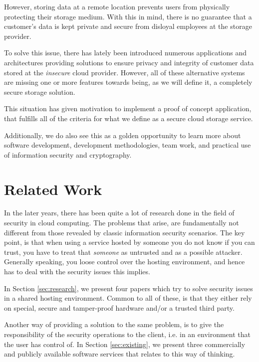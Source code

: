 \documentclass[pdftex,english,10pt,b5paper,twoside]{book}
\begin{document}
However, storing data at a remote location prevents users from physically
protecting their storage medium. With this in mind, there is no guarantee that
a customer's data is kept private and secure from disloyal employees at the
storage provider.

To solve this issue, there has lately been introduced numerous applications and
architectures \cite{dropbox_security, tahoe, tccp, PasS} providing solutions to
ensure privacy and integrity of customer data stored at the \emph{insecure}
cloud provider. However, all of these alternative systems are missing one
or more features towards being, as we will define it, a completely secure
storage solution.

This situation has given motivation to implement a proof of concept
application, that fulfills all of the criteria for what we define as a secure
cloud storage service.

Additionally, we do also see this as a golden opportunity to learn more
about software development, development methodologies, team work, and practical
use of information security and cryptography.

\section{Related Work}

In the later years, there has been quite a lot of research done in the field of
security in cloud computing. The problems that arise, are fundamentally not
different from those revealed by classic information security scenarios. The
key point, is that when using a service hosted by someone you do not know if
you can trust, you have to treat that \emph{someone} as untrusted and as a
possible attacker. Generally speaking, you loose control over the hosting
environment, and hence has to deal with the security issues this implies.

In Section \ref{sec:research}, we present four papers \cite{PasS,
privacymanager, tccp, microsoftresearch} which try to solve security issues in
a shared hosting environment. Common to all of these, is that they either rely
on special, secure and tamper-proof hardware and/or a trusted third party.

Another way of providing a solution to the same problem, is to give the
responsibility of the security operations to the client, i.e. in an environment
that the user has control of. In Section \ref{sec:existing}, we present three
commercially and publicly available software services that relates to this way
of thinking.
\end{document}
